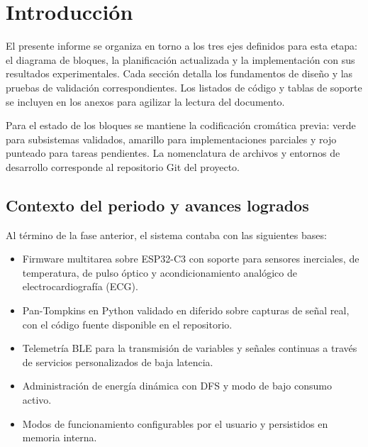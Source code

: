 \documentclass[letterpaper,11pt]{article}
\begin{document}
\section{Introducción}

El presente informe se organiza en torno a los tres ejes definidos para esta etapa: el diagrama de bloques, la planificación actualizada y la implementación con sus resultados experimentales. Cada sección detalla los fundamentos de diseño y las pruebas de validación correspondientes. Los listados de código y tablas de soporte se incluyen en los anexos para agilizar la lectura del documento.

Para el estado de los bloques se mantiene la codificación cromática previa: verde para subsistemas validados, amarillo para implementaciones parciales y rojo punteado para tareas pendientes. La nomenclatura de archivos y entornos de desarrollo corresponde al repositorio Git del proyecto.

\subsection{Contexto del periodo y avances logrados}

Al término de la fase anterior, el sistema contaba con las siguientes bases:
\begin{itemize}
    \item Firmware multitarea sobre ESP32-C3 con soporte para sensores inerciales, de temperatura, de pulso óptico y acondicionamiento analógico de electrocardiografía (ECG).
    \item Pan-Tompkins \cite{pan_tompkins} en Python validado en diferido sobre capturas de señal real, con el código fuente disponible en el repositorio.
    \item Telemetría BLE para la transmisión de variables y señales continuas a través de servicios personalizados de baja latencia.
    \item Administración de energía dinámica con DFS y modo de bajo consumo activo.
    \item Modos de funcionamiento configurables por el usuario y persistidos en memoria interna.
\end{itemize}
\end{document}
